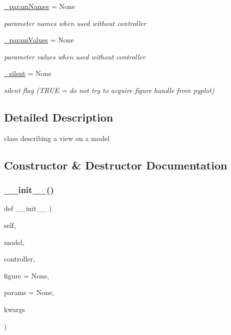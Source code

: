 \begin{DoxyCompactItemize}
\hyperlink{class_mu_mo_t_1_1_mu_mo_tview_ac7734326ac8dbbf9bd0d2c9838633195}{\+\_\+param\+Names} = None
\begin{DoxyCompactList}\small\item\em parameter names when used without controller \end{DoxyCompactList}\item 
\hyperlink{class_mu_mo_t_1_1_mu_mo_tview_a04608181fa27d9aad4983d3694f7ab17}{\+\_\+param\+Values} = None
\begin{DoxyCompactList}\small\item\em parameter values when used without controller \end{DoxyCompactList}\item 
\hyperlink{class_mu_mo_t_1_1_mu_mo_tview_a909146a3c119c927727c7d533042b184}{\+\_\+silent} = None
\begin{DoxyCompactList}\small\item\em silent flag (T\+R\+UE = do not try to acquire figure handle from pyplot) \end{DoxyCompactList}\end{DoxyCompactItemize}


\subsection{Detailed Description}
class describing a view on a model 

\subsection{Constructor \& Destructor Documentation}
\mbox{\label{class_mu_mo_t_1_1_mu_mo_tview_a367325b3bd7ca4a7b7ec4107f9aa6a16}} 
\subsubsection{\texorpdfstring{\+\_\+\+\_\+init\+\_\+\+\_\+()}{\_\_init\_\_()}}
{\footnotesize\ttfamily def \+\_\+\+\_\+init\+\_\+\+\_\+ (\begin{DoxyParamCaption}\item[{}]{self,  }\item[{}]{model,  }\item[{}]{controller,  }\item[{}]{figure = {\ttfamily None},  }\item[{}]{params = {\ttfamily None},  }\item[{}]{kwargs }\end{DoxyParamCaption})}



